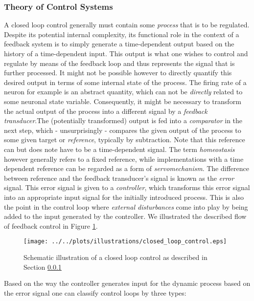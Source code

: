\documentclass[10pt,a4paper]{article}
\begin{document}
\subsubsection{Theory of Control Systems} \label{Control_Sys_Theo_Section}
A closed loop control generally must contain some \emph{process} that is to be regulated. Despite its potential internal complexity, its functional role in the context of a feedback system is to simply generate a time-dependent output based on the history of a time-dependent input. This output is what one wishes to control and regulate by means of the feedback loop and thus represents the signal that is further processed. It might not be possible however to directly quantify this desired output in terms of some internal state of the process. The firing rate of a neuron for example is an abstract quantity, which can not be \emph{directly} related to some neuronal state variable. Consequently, it might be necessary to transform the actual output of the process into a different signal by a \textit{feedback transducer}.The (potentially transformed) output is fed into a \textit{comparator} in the next step, which - unsurprisingly - compares the given output of the process to some given target or \textit{reference}, typically by subtraction. Note that this reference can but does note have to be a time-dependent signal. The term \textit{homeostasis} however generally refers to a fixed reference, while implementations with a time dependent reference can be regarded as a form of \textit{servomechanism}. The difference between reference and the feedback transducer's signal is known as the \textit{error} signal. This error signal is given to a \textit{controller}, which transforms this error signal into an appropriate input signal for the initially introduced process. This is also the point in the control loop where \textit{external disturbances} come into play by being added to the input generated by the controller. We illustrated the described flow of feedback control in Figure \ref{Closed_Loop_Control_Illustration}.
\begin{figure}
\begin{center}
\texttt{[image: ../../plots/illustrations/closed\_loop\_control.eps]}
\end{center}
\caption{Schematic illustration of a closed loop control as described in Section \ref{Control_Sys_Theo_Section}}
\label{Closed_Loop_Control_Illustration}
\end{figure}
Based on the way the controller generates input for the dynamic process based on the error signal one can classify control loops by three types:
\end{document}
